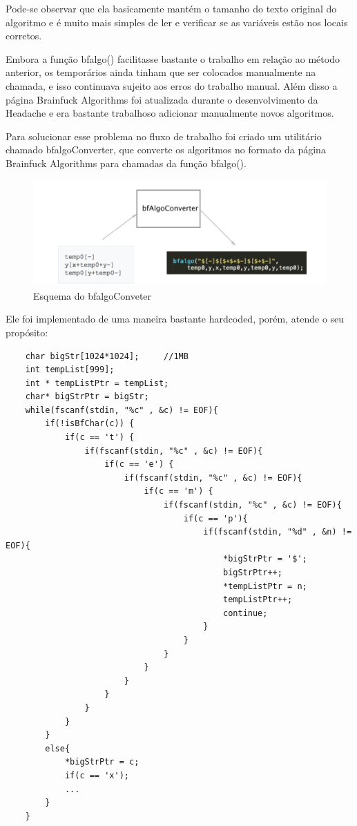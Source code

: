 Pode-se observar que ela basicamente mantém o tamanho do texto original do algoritmo e é muito mais simples de ler e verificar se as variáveis estão nos locais corretos.

Embora a função bfalgo() facilitasse bastante o trabalho em relação ao método anterior, os temporários ainda tinham que ser colocados manualmente na chamada, e isso continuava sujeito aos erros do trabalho manual. Além disso a página Brainfuck Algorithms foi atualizada durante o desenvolvimento da Headache e era bastante trabalhoso adicionar manualmente novos algoritmos.

Para solucionar esse problema no fluxo de trabalho foi criado um utilitário chamado bfalgoConverter, que converte os algoritmos no formato da página Brainfuck Algorithms para chamadas da função bfalgo(). 

\begin{figure}[h]
	\includegraphics[]{TD/img/bfalgo.png}
	\caption{Esquema do bfalgoConveter}
	\label{folders}
\end{figure}

Ele foi implementado de uma maneira bastante hardcoded, porém, atende o seu propósito:

\begin{verbatim}
    char bigStr[1024*1024];     //1MB
    int tempList[999];
    int * tempListPtr = tempList;
    char* bigStrPtr = bigStr;
    while(fscanf(stdin, "%c" , &c) != EOF){
        if(!isBfChar(c)) {
            if(c == 't') {
                if(fscanf(stdin, "%c" , &c) != EOF){
                    if(c == 'e') {
                        if(fscanf(stdin, "%c" , &c) != EOF){
                            if(c == 'm') {
                                if(fscanf(stdin, "%c" , &c) != EOF){
                                    if(c == 'p'){
                                        if(fscanf(stdin, "%d" , &n) != EOF){
                                            *bigStrPtr = '$';
                                            bigStrPtr++;
                                            *tempListPtr = n;
                                            tempListPtr++;
                                            continue;
                                        }
                                    }
                                }
                            }
                        }
                    }
                }
            }
        }
        else{
            *bigStrPtr = c;
            if(c == 'x');
            ...
        }
    }
    
\end{verbatim} 

